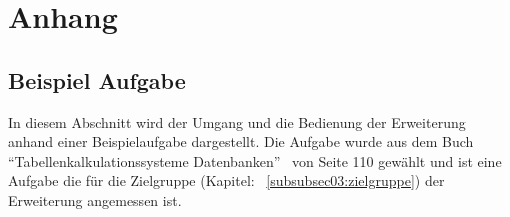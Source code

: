 \section{Anhang}
\label{sec:attachment}


\subsection{Beispiel Aufgabe}
\label{exercise}

In diesem Abschnitt wird der Umgang und die Bedienung der Erweiterung anhand einer Beispielaufgabe dargestellt. Die Aufgabe wurde aus dem Buch ``Tabellenkalkulationssysteme Datenbanken''~\cite{hubwieser_inf_2} von Seite 110 gewählt und ist eine Aufgabe die für die Zielgruppe (Kapitel: ~\ref{subsubsec03:zielgruppe}) der Erweiterung angemessen ist.

